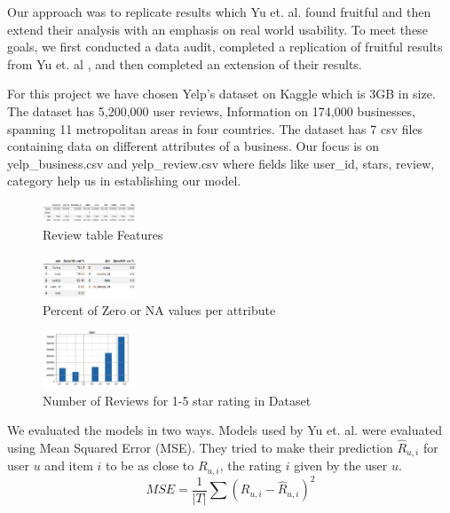 \documentclass[12pt]{article}
\begin{document}
Our approach was to replicate results which Yu et. al. \cite{yu2015restaurants} found
fruitful and then extend their analysis with an emphasis on real world usability. To meet
these goals, we first conducted a data audit, completed a replication of fruitful results
from Yu et. al \cite{yu2015restaurants}, and then completed an extension of their results.

For this project we have chosen Yelp’s dataset on Kaggle \cite{YelpData59:online}
which is 3GB in size. The dataset has 5,200,000 user reviews, Information on 174,000 businesses,
spanning 11 metropolitan areas in four countries. The dataset has 7 csv files containing data on
different attributes of a business. Our focus is on yelp\_business.csv and yelp\_review.csv where
fields like user\_id, stars, review, category help us in establishing our model.

\begin{figure}[h]
  \caption{Review table Features}
  \centering
  \includegraphics[width=0.25\textwidth]{imgs/review_table}
  \end{figure}
  
  \begin{figure}[h]
  \caption{Percent of Zero or NA values per attribute}
  \centering
  \includegraphics[width=0.25\textwidth]{imgs/dataAudit}
  \end{figure}
  
  \begin{figure}[h]
  \caption{Number of Reviews for 1-5 star rating in Dataset}
  \centering
  \includegraphics[width=0.25\textwidth]{imgs/rating}
  \end{figure}

We evaluated the models in two ways. Models used by Yu et. al. \cite{yu2015restaurants}
were evaluated using Mean Squared Error (MSE). They tried to make their prediction $\hat{R}_{u,i}$
for user $u$ and item $i$ to be as close to $R_{u,i}$, the rating $i$ given by the user $u$.
\[
MSE = \frac{1}{|T|}\sum(R_{u,i} - \hat{R}_{u,i})^2
\]
\end{document}
